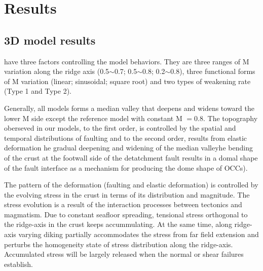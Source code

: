 \pagebreak
\section{Results}
\subsection{3D model results}
  have three factors controlling the model behaviors. They are three ranges of M variation along the ridge axis (0.5$\sim$0.7; 0.5$\sim$0.8; 0.2$\sim$0.8), three functional forms of M variation (linear; sinusoidal; square root) and two types of weakening rate (Type 1 and Type 2). 

Generally, all models forms a median valley that deepens and widens toward the lower M side except the reference model with constant M $=0.8$. The topography oberseved in our models, to the first order, is controlled by the spatial and temporal distributions of faulting and to the second order, results from elastic deformation he gradual deepening and widening of the median valleyhe bending of the crust at the footwall side of the detatchment fault results in a domal shape of the fault interface as a mechanism for producing the dome shape of OCCs).

The pattern of the deformation (faulting and elastic deformation) is controlled by the evolving stress in the crust in terms of its distribution and magnitude. The stress evolution is a result of the interaction processes between tectonics and magmatism. Due to constant seafloor spreading, tensional stress orthogonal to the ridge-axis in the crust keeps accummulating. At the same time, along ridge-axis varying diking partially accommodates the stress from far field extension and perturbs the homogeneity state of stress distribution along the ridge-axis. Accumulated stress will be largely released when the normal or shear failures establish.

